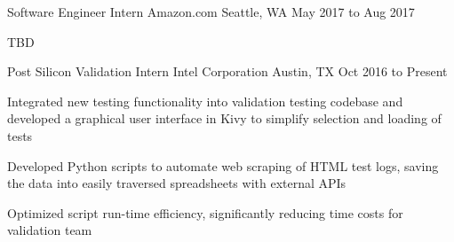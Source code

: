 \begin{cventries}
  \cventry
    {Software Engineer Intern}
    {Amazon.com}
    {Seattle, WA}
    {May 2017 to Aug 2017}
    {
      \begin{cvitems}
        \item {TBD}
      \end{cvitems}
    }
  \cventry
    {Post Silicon Validation Intern}
    {Intel Corporation}
    {Austin, TX}
    {Oct 2016 to Present}
    {
      \begin{cvitems}
        \item {Integrated new testing functionality into validation testing codebase and developed a graphical user interface in Kivy to simplify selection and loading of tests}
        \item {Developed Python scripts to automate web scraping of HTML test logs, saving the data into easily traversed spreadsheets with external APIs}
        \item {Optimized script run-time efficiency, significantly reducing time costs for validation team}
      \end{cvitems}
    }
\end{cventries}
